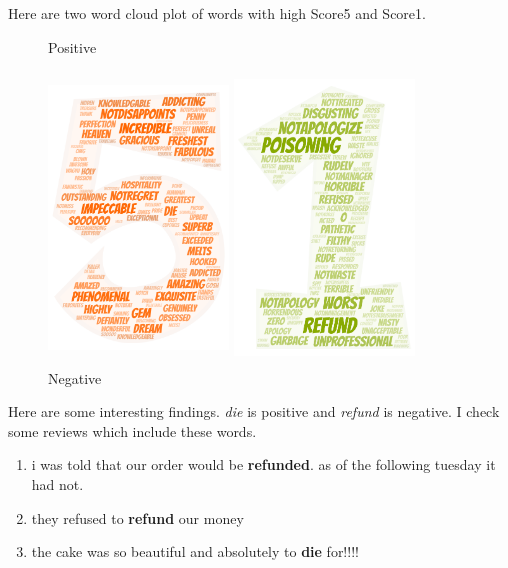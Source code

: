 \documentclass[UTF8]{article}
\begin{document}
Here are two word cloud plot of words with high Score5 and Score1.

\begin{figure}[htbp]
    \centering
    \begin{minipage}[t]{0.5\textwidth}
    \caption{Positive}
    \centering
    \includegraphics[width=4.8cm,height=7.75cm]{../image/5.png}
    
    \end{minipage}
    \begin{minipage}[t]{0.48\textwidth}
    \caption{Negative}
    \centering
    \includegraphics[width=4.8cm,height=7.75cm]{../image/1.png}
    
    \end{minipage}
\end{figure}

Here are some interesting findings. \textit{die} is positive and \textit{refund} is negative. I check some reviews which include these words. 


\begin{enumerate}
\item i was told that our order would be \textbf{refunded}. as of the following tuesday it had not.
\item they refused to \textbf{refund} our money
\item the cake was so beautiful and absolutely to \textbf{die} for!!!!
\end{enumerate}
\end{document}
